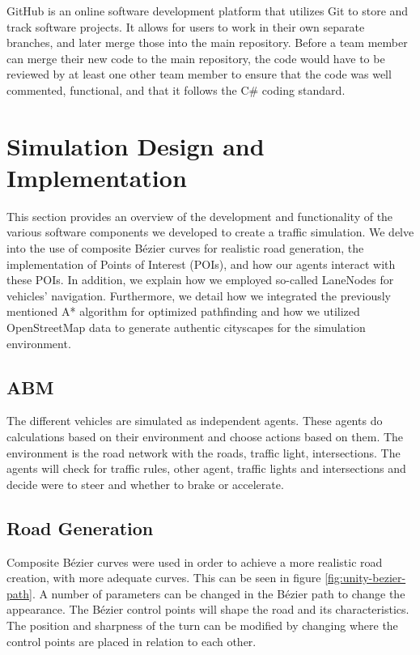         GitHub\cite{github} is an online software development platform that utilizes Git to store and track software projects. It allows for users to work in their own separate branches, and later merge those into the main repository. Before a team member can merge their new code to the main repository, the code would have to be reviewed by at least one other team member to ensure that the code was well commented, functional, and that it follows the C\# coding standard.


\section{Simulation Design and Implementation}
    This section provides an overview of the development and functionality of the various software components we developed to create a traffic simulation. We delve into the use of composite Bézier curves for realistic road generation, the implementation of Points of Interest (POIs), and how our agents interact with these POIs. In addition, we explain how we employed so-called LaneNodes for vehicles' navigation. Furthermore, we detail how we integrated the previously mentioned A* algorithm for optimized pathfinding and how we utilized OpenStreetMap data to generate authentic cityscapes for the simulation environment.

    \subsection{ABM}
        The different vehicles are simulated as independent agents. These agents do calculations based on their environment and choose actions based on them. The environment is the road network with the roads, traffic light, intersections. The agents will check for traffic rules, other agent, traffic lights and intersections and decide were to steer and whether to brake or accelerate. 

    \subsection{Road Generation}
        Composite Bézier curves were used in order to achieve a more realistic road creation,  with more adequate curves. This can be seen in figure \ref{fig:unity-bezier-path}. A number of parameters can be changed in the Bézier path to change the appearance. The Bézier control points will shape the road and its characteristics. The position and sharpness of the turn can be modified by changing where the control points are placed in relation to each other. 
        
